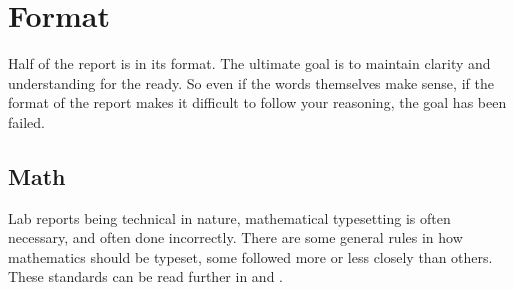 \documentclass{bannerReport}
\begin{document}
		\section{Format}
			Half of the report is in its format. The ultimate goal is to maintain clarity and understanding for the ready. So even if the words themselves make sense, if the format of the report makes it difficult to follow your reasoning, the goal has been failed.

			\subsection{Math}
				Lab reports being technical in nature, mathematical typesetting is often necessary, and often done incorrectly. There are some general rules in how mathematics should be typeset, some followed more or less closely than others. These standards can be read further in \cite{tug} and \cite{iupac}.
				\newline
				\newline
\end{document}
